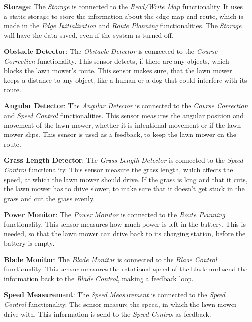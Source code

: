 \textbf{Storage}:
The \textit{Storage} is connected to the \textit{Read/Write Map} functionality. It uses a static storage to store the information about the edge map and route, which is made in the \textit{Edge Initialization} and \textit{Route Planning} functionalities. The \textit{Storage} will have the data saved, even if the system is turned off.

\textbf{Obstacle Detector}:
The \textit{Obstacle Detector} is connected to the \textit{Course Correction} functionality. This sensor detects, if there are any objects, which blocks the lawn mower's route. This sensor makes sure, that the lawn mower keeps a distance to any object, like a human or a dog that could interfere with its route.

\textbf{Angular Detector}:
The \textit{Angular Detector} is connected to the \textit{Course Correction} and \textit{Speed Control} functionalities. This sensor measures the angular position and movement of the lawn mower, whether it is intentional movement or if the lawn mower slips. This sensor is used as a feedback, to keep the lawn mower on the route.

\textbf{Grass Length Detector}:
The \textit{Grass Length Detector} is connected to the \textit{Speed Control} functionality. This sensor measure the  grass length, which affects the speed, at which the lawn mower should drive. If the grass is long and that it cuts, the lawn mower has to drive slower, to make sure that it doesn't get stuck in the grass and cut the grass evenly. 

\textbf{Power Monitor}:
The \textit{Power Monitor} is connected to the \textit{Route Planning} functionality. This sensor measures how much power  is left in the battery. This is needed, so that the lawn mower can drive back to its charging station, before the battery is empty.

\textbf{Blade Monitor}:
The \textit{Blade Monitor} is connected to the \textit{Blade Control} functionality. This sensor measures the rotational speed of the blade and send the information back to the \textit{Blade Control}, making a feedback loop.

\textbf{Speed Measurement}:
The \textit{Speed Measurement} is connected to the \textit{Speed Control} functionality. The sensor measure the speed, in which the lawn mower drive with. This information is send to the \textit{Speed Control} as feedback.
